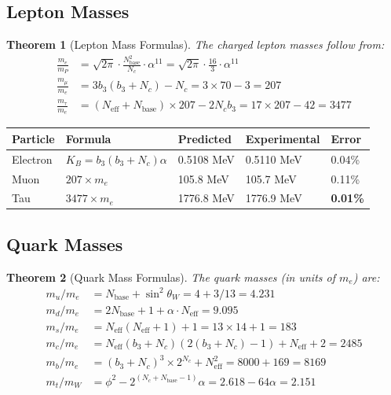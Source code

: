 \documentclass[11pt,a4paper]{article}
\newtheorem{theorem}{Theorem}[section]
\theoremstyle{definition}
\theoremstyle{remark}
\newcommand{\Neff}{N_{\text{eff}}}
\begin{document}
\subsection{Lepton Masses}

\begin{theorem}[Lepton Mass Formulas]
The charged lepton masses follow from:
\begin{align}
\frac{m_e}{m_P} &= \sqrt{2\pi} \cdot \frac{N_{\text{base}}^2}{N_c} \cdot \alpha^{11} = \sqrt{2\pi} \cdot \frac{16}{3} \cdot \alpha^{11} \\
\frac{m_\mu}{m_e} &= 3b_3(b_3 + N_c) - N_c = 3 \times 70 - 3 = 207 \\
\frac{m_\tau}{m_e} &= (\Neff + N_{\text{base}}) \times 207 - 2N_c b_3 = 17 \times 207 - 42 = 3477
\end{align}
\end{theorem}

\begin{center}
\begin{tabular}{lllll}
\toprule
Particle & Formula & Predicted & Experimental & Error \\
\midrule
Electron & $K_B = b_3(b_3+N_c)\alpha$ & 0.5108 MeV & 0.5110 MeV & 0.04\% \\
Muon & $207 \times m_e$ & 105.8 MeV & 105.7 MeV & 0.11\% \\
Tau & $3477 \times m_e$ & 1776.8 MeV & 1776.9 MeV & \textbf{0.01\%} \\
\bottomrule
\end{tabular}
\end{center}

\subsection{Quark Masses}

\begin{theorem}[Quark Mass Formulas]
The quark masses (in units of $m_e$) are:
\begin{align}
m_u/m_e &= N_{\text{base}} + \sin^2\theta_W = 4 + 3/13 = 4.231 \\
m_d/m_e &= 2N_{\text{base}} + 1 + \alpha \cdot \Neff = 9.095 \\
m_s/m_e &= \Neff(\Neff + 1) + 1 = 13 \times 14 + 1 = 183 \\
m_c/m_e &= \Neff(b_3 + N_c)(2(b_3 + N_c) - 1) + \Neff + 2 = 2485 \\
m_b/m_e &= (b_3 + N_c)^3 \times 2^{N_c} + \Neff^2 = 8000 + 169 = 8169 \\
m_t/m_W &= \phi^2 - 2^{(N_c + N_{\text{base}} - 1)}\alpha = 2.618 - 64\alpha = 2.151
\end{align}
\end{theorem}
\end{document}

